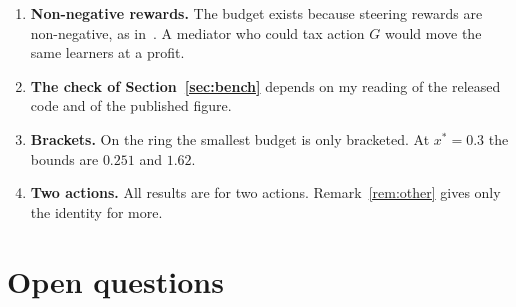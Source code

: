 \documentclass[11pt,a4paper]{article}
\theoremstyle{definition}
\theoremstyle{plain}
\newcommand{\xs}{x^{*}}
\begin{document}
\begin{enumerate}
\item \textbf{Non-negative rewards.} The budget exists because steering rewards are non-negative, as in~\cite{huang2025}. A mediator who could tax action $G$ would move the same learners at a profit.
\item \textbf{The check of Section~\ref{sec:bench}} depends on my reading of the released code and of the published figure.
\item \textbf{Brackets.} On the ring the smallest budget is only bracketed. At $\xs=0.3$ the bounds are $0.251$ and $1.62$.
\item \textbf{Two actions.} All results are for two actions. Remark~\ref{rem:other} gives only the identity for more.
\end{enumerate}

\section{Open questions}\label{sec:next}
\end{document}

